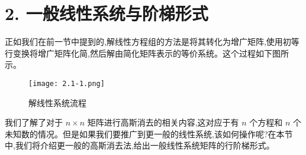 \newcommand{\circlednum}[1]{%
    \tikz[baseline=(char.base)]{%
        \node[draw, circle, inner sep=1pt] (char) {#1};%
    }%
}

\section*{2. 一般线性系统与阶梯形式}
正如我们在前一节中提到的,解线性方程组的方法是将其转化为增广矩阵,使用初等行变换将增广矩阵化简,然后解由简化矩阵表示的等价系统。这个过程如下图所示。

\begin{figure}[h]
    \centering
    \texttt{[image: 2.1-1.png]} %
    \caption{解线性系统流程}
    \label{fig:linear_system_process}
\end{figure}

我们了解了对于 \(n \times n\) 矩阵进行高斯消去的相关内容,这对应于有 \(n\) 个方程和 \(n\) 个未知数的情况。但是如果我们要推广到更一般的线性系统,该如何操作呢?在本节中,我们将介绍更一般的高斯消去法,给出一般线性系统矩阵的行阶梯形式。

